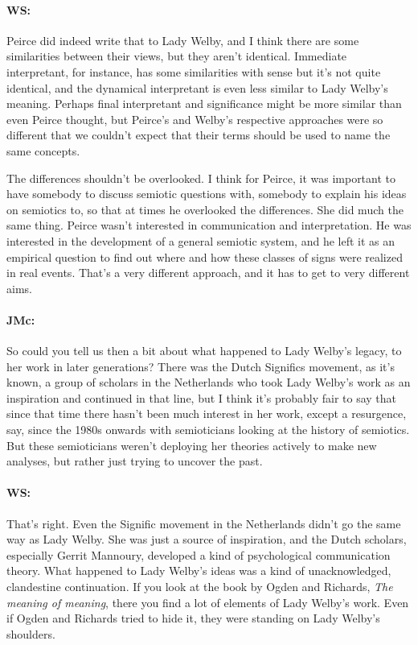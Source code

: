 \documentclass[output=paper]{langscibook}
\begin{document}
\largerpage
\paragraph*{WS:} Peirce did indeed write that to Lady Welby, and I think there are some similarities between their views, but they aren’t identical. Immediate interpretant, for instance, has some similarities with sense but it’s not quite identical, and the dynamical interpretant is even less similar to Lady Welby’s meaning. Perhaps final interpretant and significance might be more similar than even Peirce thought, but Peirce’s and Welby’s respective approaches were so different that we couldn’t expect that their terms should be used to name the same concepts.

The differences shouldn’t be overlooked. I think for Peirce, it was important to have somebody to discuss semiotic questions with, somebody to explain his ideas on semiotics to, so that at times he overlooked the differences. She did much the same thing. Peirce wasn’t interested in communication and interpretation. He was interested in the development of a general semiotic system, and he left it as an empirical question to find out where and how these classes of signs were realized in real events. That’s a very different approach, and it has to get to very different aims.

\paragraph*{JMc:} So could you tell us then a bit about what happened to Lady Welby’s legacy, to her work in later generations? There was the Dutch Significs movement, as it’s known, a group of scholars in the Netherlands who took Lady Welby’s work as an inspiration and continued in that line, but I think it’s probably fair to say that since that time there hasn’t been much interest in her work, except a resurgence, say, since the 1980s onwards with semioticians looking at the history of semiotics. But these semioticians weren’t deploying her theories actively to make new analyses, but rather just trying to uncover the past.

\paragraph*{WS:} That’s right. Even the Signific movement in the Netherlands didn’t go the same way as Lady Welby. She was just a source of inspiration, and the Dutch scholars, especially Gerrit Mannoury, developed a kind of psychological communication theory. What happened to Lady Welby’s ideas was a kind of unacknowledged, clandestine continuation. If you look at the book by Ogden and Richards, \textit{The meaning of meaning}, there you find a lot of elements of Lady Welby’s work. Even if Ogden and Richards tried to hide it, they were standing on Lady Welby’s shoulders.
\end{document}
